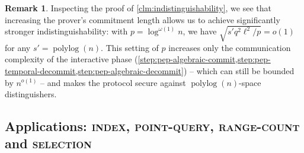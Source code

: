 \documentclass[10pt,a4paper]{article}
\theoremstyle{definition}
\newtheorem{remark}[theorem]{Remark}
\newcommand{\polylog}{\operatorname{polylog}}
\newcommand{\indexproblem}{\normalfont\textsc{index}\xspace}
\newcommand{\pointquery}{\normalfont\textsc{point-query}\xspace}
\newcommand{\rangecount}{\normalfont\textsc{range-count}\xspace}
\newcommand{\selection}{\normalfont\textsc{selection}\xspace}
\newcommand{\pcommitlength}{p}
\newcommand{\fieldsize}{q}
\begin{document}
\begin{remark}
    \label{rem:indistinguishability-pep}
    Inspecting the proof of \cref{clm:indistinguishability}, we see that increasing the prover's commitment length allows us to achieve significantly stronger indistinguishability: with $\pcommitlength = \log^{\omega(1)} n$, we have $\sqrt{s' \fieldsize^2 \ell^2/\pcommitlength} = o(1)$ for any $s' = \polylog(n)$. This setting of $\pcommitlength$ increases only the communication complexity of the interactive phase (\cref{step:pep-algebraic-commit,step:pep-temporal-decommit,step:pep-algebraic-decommit}) -- which can still be bounded by $n^{o(1)}$ -- and makes the protocol secure against $\polylog(n)$-space distinguishers.
\end{remark}

\subsection{Applications: \indexproblem, \pointquery, \rangecount and \selection}
\label{sec:pep-applications}
\end{document}
